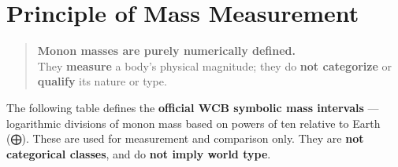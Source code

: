 \documentclass[
  letterpaper,
]{book}
\begin{document}
\chapter{Principle of Mass
Measurement}\label{principle-of-mass-measurement}

\begin{quote}
\textbf{Monon masses are purely numerically defined.}\\
They \textbf{measure} a body's physical magnitude; they do \textbf{not
categorize} or \textbf{qualify} its nature or type.
\end{quote}

The following table defines the \textbf{official WCB symbolic mass
intervals} --- logarithmic divisions of monon mass based on powers of
ten relative to Earth (⨁). These are used for measurement and comparison
only. They are \textbf{not categorical classes}, and do \textbf{not
imply world type}.
\end{document}
